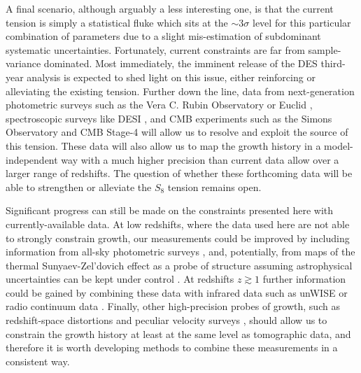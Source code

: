 \documentclass[a4paper,11pt]{article}
\newcommand{\des}{DES\xspace}
\begin{document}
    A final scenario, although arguably a less interesting one, is that the current tension is simply a statistical fluke which sits at the $\sim3\sigma$ level for this particular combination of parameters due to a slight mis-estimation of subdominant systematic uncertainties. Fortunately, current constraints are far from sample-variance dominated. Most immediately, the imminent release of the \des third-year analysis is expected to shed light on this issue, either reinforcing or alleviating the existing tension. Further down the line, data from next-generation photometric surveys such as the Vera C. Rubin Observatory \cite{0912.0201} or Euclid \cite{1001.0061}, spectroscopic surveys like DESI \cite{1611.00036}, and CMB experiments such as the Simons Observatory \cite{1808.07445} and CMB Stage-4 \cite{1610.02743} will allow us to resolve and exploit the source of this tension. These data will also allow us to map the growth history in a model-independent way with a much higher precision than current data allow over a larger range of redshifts. The question of whether these forthcoming data will be able to strengthen or alleviate the $S_8$ tension remains open. 
    
    Significant progress can still be made on the constraints presented here with currently-available data. At low redshifts, where the data used here are not able to strongly constrain growth, our measurements could be improved by including information from all-sky photometric surveys \citep{1311.5246,1607.01182}, and, potentially, from maps of the thermal Sunyaev-Zel'dovich effect as a probe of structure \cite{1502.01596,1712.00788,1909.09102,2102.07701} assuming astrophysical uncertainties can be kept under control \citep{1312.5341,2010.07797}. At redshifts $z\gtrsim1$ further information could be gained by combining these data with infrared data such as unWISE \cite{1909.07412,2105.03421} or radio continuum data \cite{1908.10309,2009.01817}. Finally, other high-precision probes of growth, such as redshift-space distortions and peculiar velocity surveys \cite{1609.08247,2105.05185}, should allow us to constrain the growth history at least at the same level as tomographic data, and therefore it is worth developing methods to combine these measurements in a consistent way.
\end{document}
